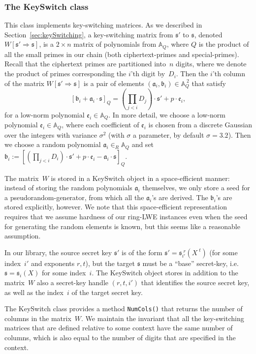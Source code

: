 \documentclass[14pt]{extarticle}
\newcommand{\secref}[1]{Section~\protect\ref{sec:#1}}
\newcommand{\A}{\mathbb{A}}
\def\KeySwitch{\textsf{KeySwitch}}
\newcommand{\mfa}{\mathfrak{a}}
\newcommand{\mfb}{\mathfrak{b}}
\newcommand{\ee}{\mathfrak{e}}
\newcommand{\sk}{\mathfrak{s}}
\begin{document}
\subsubsection{The {\KeySwitch} class}\label{sec:KeySwitch}
This class implements key-switching matrices. As we described in
\secref{keySwitching}, a key-switching matrix from $\sk'$ to $\sk$,
denoted $W[\sk'\Rightarrow\sk]$, is a $2\times n$ matrix of
polynomials from $\A_Q$, where $Q$ is the product of all the small
primes in our chain (both ciphertext-primes and special-primes).
Recall that the ciphertext primes are partitioned into~$n$ digits,
where we denote the product of primes corresponding the $i$'th digit
by~$D_i$. Then the $i$'th column of the matrix $W[\sk'\Rightarrow\sk]$
is a pair of elements $(\mfa_i,\mfb_i)\in\A_Q^{\;2}$ that satisfy
$$
[\mfb_i+\mfa_i\cdot\sk]_Q=(\prod_{j<i}D_j)\cdot\sk' + p\cdot\ee_i,
$$
for a low-norm polynomial $\ee_i\in\A_Q$. In more detail, we choose a
low-norm polynomial $\ee_i\in\A_Q$, where each coefficient of $\ee_i$
is chosen from a discrete Gaussian over the integers with variance
$\sigma^2$ (with $\sigma$ a parameter, by default $\sigma=3.2$).
Then we choose a random polynomial $\mfa_i\in_R\A_Q$ and set $\mfb_i:=
\left[(\prod_{j<i}D_i)\cdot\sk'+p\cdot\ee_i-\mfa_i\cdot\sk\right]_Q$.

The matrix~$W$ is stored in a {\KeySwitch} object in a space-efficient
manner: instead of storing the random polynomials $\mfa_i$ themselves,
we only store a seed for a pseudorandom-generator, from which all the
$\mfa_i$'s are derived. The $\mfb_i$'s are stored explicitly, however.
We note that this space-efficient representation requires that we
assume hardness of our ring-LWE instances even when the seed for
generating the random elements is known, but this seems like a
reasonable assumption.

In our library, the source secret key $\sk'$ is of the form $\sk'=
\sk_{i'}^{\;r}(X^{\;t})$ (for some index~$i'$ and exponents $r,t$),
but the target $\sk$ must be a ``base'' secret-key, i.e. $\sk=
\sk_i(X)$ for some index~$i$. The {\KeySwitch} object stores in
addition to the matrix~$W$ also a secret-key handle $(r,t,i')$ that
identifies the source secret key, as well as the index~$i$ of the
target secret key.

The {\KeySwitch} class provides a method \texttt{NumCols()} that
returns the number of columns in the matrix~$W$. We maintain the
invariant that all the key-switching matrices that are defined
relative to some context have the same number of columns, which is
also equal to the number of digits that are specified in the context.
\end{document}

